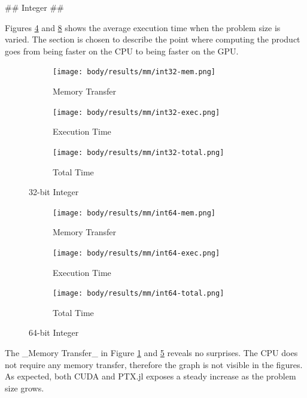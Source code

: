 \begin{markdown}
## Integer ##

Figures \ref{fig:res:mm:int32} and \ref{fig:res:mm:int64} shows the
average execution time when the problem size is varied. The section is
chosen to describe the point where computing the product goes from
being faster on the CPU to being faster on the GPU.

\begin{figure}[H]
  \centering
  \begin{subfigure}{.33\textwidth}
    \centering
    \texttt{[image: body/results/mm/int32-mem.png]}
    \caption{Memory Transfer}
    \label{fig:res:mm:int32:mem}
  \end{subfigure}%
  \begin{subfigure}{.33\textwidth}
    \centering
    \texttt{[image: body/results/mm/int32-exec.png]}
    \caption{Execution Time}
    \label{fig:res:mm:int32:exec}
  \end{subfigure}%
  \begin{subfigure}{.33\textwidth}
    \centering
    \texttt{[image: body/results/mm/int32-total.png]}
    \caption{Total Time}
    \label{fig:res:mm:int32:tot}
  \end{subfigure}
  \caption{32-bit Integer}
  \label{fig:res:mm:int32}
\end{figure}

\begin{figure}[H]
  \centering
  \begin{subfigure}{.33\textwidth}
    \centering
    \texttt{[image: body/results/mm/int64-mem.png]}
    \caption{Memory Transfer}
    \label{fig:res:mm:int64:mem}
  \end{subfigure}%
  \begin{subfigure}{.33\textwidth}
    \centering
    \texttt{[image: body/results/mm/int64-exec.png]}
    \caption{Execution Time}
    \label{fig:res:mm:int64:exec}
  \end{subfigure}%
  \begin{subfigure}{.33\textwidth}
    \centering
    \texttt{[image: body/results/mm/int64-total.png]}
    \caption{Total Time}
    \label{fig:res:mm:int64:tot}
  \end{subfigure}
  \caption{64-bit Integer}
  \label{fig:res:mm:int64}
\end{figure}

The _Memory Transfer_ in Figure \ref{fig:res:mm:int32:mem} and
\ref{fig:res:mm:int64:mem} reveals no surprises. The CPU does not
require any memory transfer, therefore the graph is not visible in the
figures. As expected, both CUDA and PTX.jl exposes a steady increase
as the problem size grows.


\end{markdown}
